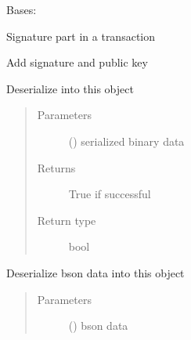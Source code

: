\documentclass[letterpaper,10pt,english]{sphinxmanual}
\begin{document}
\begin{fulllineitems}
\label{\detokenize{bbc1.core.bbclib:bbc1.core.bbclib.BBcSignature}}
Bases: 

Signature part in a transaction

\begin{fulllineitems}
\label{\detokenize{bbc1.core.bbclib:bbc1.core.bbclib.BBcSignature.add}}
Add signature and public key

\end{fulllineitems}


\begin{fulllineitems}
\label{\detokenize{bbc1.core.bbclib:bbc1.core.bbclib.BBcSignature.deserialize}}
Deserialize into this object
\begin{quote}\begin{description}
\item[{Parameters}] \leavevmode
{} () \textendash{} serialized binary data

\item[{Returns}] \leavevmode
True if successful

\item[{Return type}] \leavevmode
bool

\end{description}\end{quote}

\end{fulllineitems}


\begin{fulllineitems}
\label{\detokenize{bbc1.core.bbclib:bbc1.core.bbclib.BBcSignature.deserialize_bson}}
Deserialize bson data into this object
\begin{quote}\begin{description}
\item[{Parameters}] \leavevmode
{} () \textendash{} bson data


\end{description}
\end{quote}
\end{fulllineitems}
\end{fulllineitems}
\end{document}
